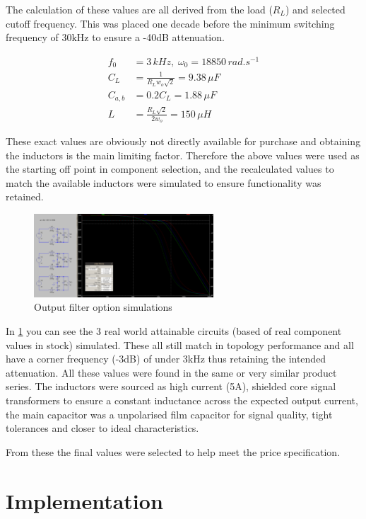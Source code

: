 \documentclass[11pt]{article}
\begin{document}
{The calculation of these values are all derived from the load ($R_L$) and selected cutoff frequency. This was placed one decade before the minimum switching frequency of 30kHz to ensure a -40dB attenuation.

\begin{align}
    f_{0} &= 3\,kHz, \; \omega_{0} = 18850\,rad.s^{-1} \\
    C_{L} &= \frac{1}{R_{L}w_{o}\sqrt{2}} = 9.38\,\mu F \\
  C_{a,b} &= 0.2C_{L} = 1.88\,\mu F \\
        L &= \frac{R_{L}\sqrt{2}}{2w_{o}} = 150\,\mu H
\end{align}

These exact values are obviously not directly available for purchase and obtaining the inductors is the main limiting factor. Therefore the above values were used as the starting off point in component selection, and the recalculated values to match the available inductors were simulated to ensure functionality was retained. 

\begin{figure}[h!]
  \centering
  \includegraphics[width=0.6\textwidth]{img/output_filter_sim.png}
  \caption{Output filter option simulations}
  \label{F:opf_sim}
\end{figure}

In \cref{F:opf_sim} you can see the 3 real world attainable circuits (based of real component values in stock) simulated. These all still match in topology performance and all have a corner frequency (-3dB) of under 3kHz thus retaining the intended attenuation.
All these values were found in the same or very similar product series. The inductors were sourced as high current (5A), shielded core signal transformers to ensure a constant inductance across the expected output current, the main capacitor was a unpolarised film capacitor for signal quality, tight tolerances and closer to ideal characteristics.

From these the final values were selected to help meet the price specification.

\section{Implementation}
}
\end{document}
